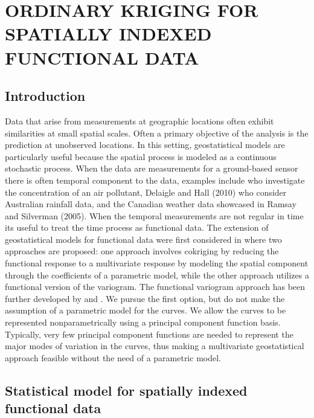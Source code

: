 

\chapter{ORDINARY KRIGING FOR SPATIALLY INDEXED FUNCTIONAL DATA} 
\label{ch:functional kriging}

\section{Introduction} 

\label{sec:introduction}

Data that arise from measurements at geographic locations often exhibit similarities at small spatial scales. Often a primary objective of the analysis is the prediction at unobserved locations. In this setting, geostatistical models are particularly useful because the spatial process is modeled as a continuous stochastic process. When the data are measurements for a ground-based sensor there is often temporal component to the data, examples include \cite{Kaiser:2002wna} who investigate the concentration of an air pollutant, Delaigle and Hall (2010) who consider Australian rainfall data, and the Canadian weather data showcased in Ramsay and Silverman (2005). When the temporal measurements are not regular in time its useful to treat the time process as functional data. The extension of geostatistical models for functional data were first considered in \cite{Goulard:1993} where two approaches are proposed: one approach involves cokriging by reducing the functional response to a multivariate response by modeling the spatial component through the coefficients of a parametric model, while the other approach utilizes a functional version of the variogram. The functional variogram approach has been further developed by \cite{Giraldo:2010jx} and \cite{Nerini:2010ba}. We pursue the first option, but do not make the assumption of a parametric model for the curves. We allow the curves to be represented nonparametrically using a principal component function basis. Typically, very few principal component functions are needed to represent the major modes of variation in the curves, thus making a multivariate geostatistical approach feasible without the need of a parametric model. 


\section{Statistical model for spatially indexed functional data} 

